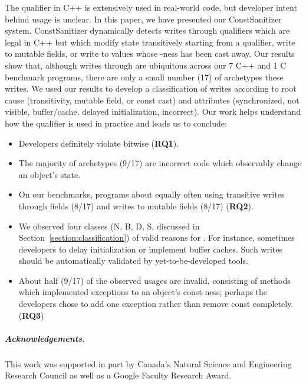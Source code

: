 The \const{} qualifier in C++ is extensively used in real-world code,
but developer intent behind \const{} usage is unclear.
In this paper, we have presented our ConstSanitizer system.
ConstSanitizer dynamically detects writes through \const{} qualifiers which are
legal in C++ but which modify state transitively starting from a \const{}
qualifier, write to mutable fields, or write to values whose \const{}-ness has
been cast away.
Our results show that, although writes through \const{} are ubiquitous across
our 7 C++ and 1 C benchmark programs, there are only a small number (17) of
archetypes these writes.
We used our results to develop a classification of writes according to root
cause (transitivity, mutable field, or const cast) and attributes (synchronized,
not visible, buffer/cache, delayed initialization, incorrect).
Our work helps understand how the \const{} qualifier is used in practice and
leads us to conclude:

\begin{itemize}
  \item Developers definitely violate bitwise \const{} ({\bf RQ1}).
  \item The majority of \wtc{} archetypes (9/17) are incorrect code
        which observably change an object's state.
  \item On our benchmarks, programs \wtc{} about equally often using transitive
        writes through fields (8/17) and writes to mutable fields (8/17) ({\bf RQ2}).
  \item We observed four classes (N, B, D, S, discussed in
        Section~\ref{section:classification}) of valid reasons for \wstcqs{}.
        For instance, sometimes developers \wtc{} to
        delay initialization or implement buffer caches.
        Such writes should be automatically validated by yet-to-be-developed
        tools.
  \item About half (9/17) of the observed usages are invalid, consisting of methods
        which implemented exceptions to an object's const-ness; perhaps the developers
        chose to add one exception rather than remove const completely. ({\bf RQ3})
\end{itemize}

\subparagraph*{Acknowledgements.}
This work was supported in part by Canada's Natural Science and Engineering Research
Council as well as a Google Faculty Research Award.
